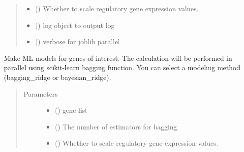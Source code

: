 \documentclass[letterpaper,10pt,english]{sphinxmanual}
\begin{document}
\begin{fulllineitems}
\begin{fulllineitems}
\begin{quote}
\begin{description}
\begin{itemize}
\item {} 
 () \textendash{} Whether to scale regulatory gene expression values.

\item {} 
 () \textendash{} log object to output log

\item {} 
 () \textendash{} verbose for joblib parallel

\end{itemize}

\end{description}\end{quote}

\end{fulllineitems}


\begin{fulllineitems}
\label{\detokenize{modules/celloracle:celloracle.Net.fit_genes}}
Make ML models for genes of interest.
The calculation will be performed in parallel using scikit-learn bagging function.
You can select a modeling method (bagging\_ridge or bayesian\_ridge).
\begin{quote}\begin{description}
\item[{Parameters}] \leavevmode\begin{itemize}
\item {} 
 () \textendash{} gene list

\item {} 
 () \textendash{} The number of estimators for bagging.

\item {} 
 () \textendash{} Whether to scale regulatory gene expression values.


\end{itemize}
\end{description}
\end{quote}
\end{fulllineitems}
\end{fulllineitems}
\end{document}
